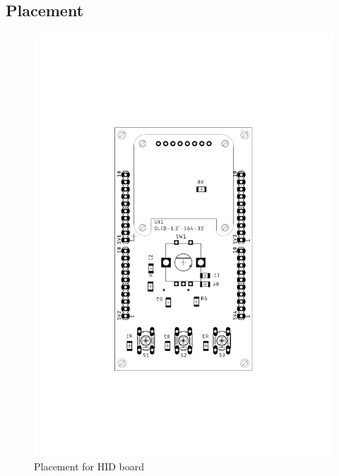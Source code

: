 \documentclass{article}
\begin{document}
     \subsection{Placement}
         \begin{figure}[H]
  	\centering
  	\includegraphics[width=1\linewidth]{OLED-placement.pdf}
  	\caption{Placement for HID board}
 	 \label{fig:place4}
\end{figure}
\end{document}
